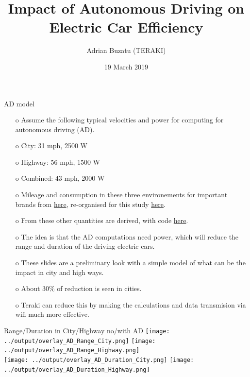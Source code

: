 \documentclass{beamer}
\title[AD impact on electric car efficiency]{Impact of Autonomous Driving on Electric Car Efficiency}
\author[Adrian Buzatu (TERAKI) ]{Adrian Buzatu (TERAKI)}
\date{19 March 2019}
\begin{document}

\frame{\titlepage} 
\def \AdrianSize {0.45}
\def \AdrianSizeOne {0.95}



\begin{frame}{AD model}
\begin{enumerate}
\item[o] Assume the following typical velocities and power for computing for autonomous driving (AD).
\item[o] City: 31 mph, 2500 W
\item[o] Highway: 56 mph, 1500 W
\item[o] Combined: 43 mph, 2000 W
\item[o] Mileage and consumption in these three environements for important brands from \href{https://pushevs.com/electric-car-range-efficiency-epa/}{here}, re-organised for this study \href{https://gitlab.cern.ch/abuzatu/BuzatuPython/blob/master/examples/teraki/electricCarEfficiency/input/data.txt}{here}.
\item[o] From these other quantities are derived, with code \href{https://gitlab.cern.ch/abuzatu/BuzatuPython/blob/master/examples/teraki/electricCarEfficiency/electricCarEfficiency.py}{here}.
\item[o] The idea is that the AD computations need power, which will reduce the range and duration of the driving electric cars.
\item[o] These slides are a preliminary look with a simple model of what can be the impact in city and high ways.
\item[o] About 30\% of reduction is seen in cities. 
\item[o] Teraki can reduce this by making the calculations and data transmision via wifi much more effective.
\end{enumerate}
\end{frame}

\begin{frame}{Range/Duration in City/Highway no/with AD}
\centering
\texttt{[image: ../output/overlay\_AD\_Range\_City.png]}
\texttt{[image: ../output/overlay\_AD\_Range\_Highway.png]}\\
\texttt{[image: ../output/overlay\_AD\_Duration\_City.png]}
\texttt{[image: ../output/overlay\_AD\_Duration\_Highway.png]}\\
\end{frame}
\end{document}
